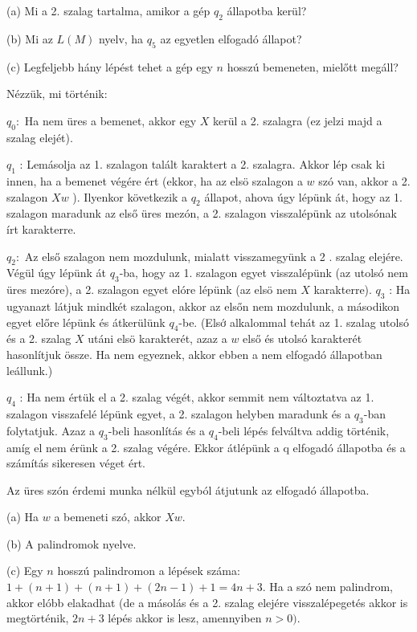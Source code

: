 (a) Mi a 2. szalag tartalma, amikor a gép $q_{2}$ állapotba kerül?

(b) Mi az $L(M)$ nyelv, ha $q_{5}$ az egyetlen elfogadó állapot?

(c) Legfeljebb hány lépést tehet a gép egy $n$ hosszú bemeneten, mielőtt megáll?


Nézzük, mi történik:

$q_{0}:$ Ha nem üres a bemenet, akkor egy $X$ kerül a 2. szalagra (ez jelzi majd a szalag elejét).

$q_{1}$ : Lemásolja az 1. szalagon talált karaktert a 2. szalagra. Akkor lép csak ki innen, ha a bemenet végére ért (ekkor, ha az elsö szalagon a $w$ szó van, akkor a 2. szalagon $X w$ ). Ilyenkor következik a $q_{2}$ állapot, ahova úgy lépünk át, hogy az 1. szalagon maradunk az első üres mezón, a 2. szalagon visszalépünk az utolsónak írt karakterre.

$q_{2}:$ Az első szalagon nem mozdulunk, mialatt visszamegyünk a 2 . szalag elejére. Végül úgy lépünk át $q_{3}$-ba, hogy az 1. szalagon egyet visszalépünk (az utolsó nem üres mezóre), a 2. szalagon egyet elóre lépünk (az elsö nem $X$ karakterre). $q_{3}$ : Ha ugyanazt látjuk mindkét szalagon, akkor az elsőn nem mozdulunk, a másodikon egyet előre lépünk és átkerülünk $q_{4}$-be. (Elsớ alkalommal tehát az 1. szalag utolsó és a 2. szalag $X$ utáni elsö karakterét, azaz a $w$ első és utolsó karakterét hasonlítjuk össze. Ha nem egyeznek, akkor ebben a nem elfogadó állapotban leállunk.)

$q_{4}$ : Ha nem értük el a 2. szalag végét, akkor semmit nem változtatva az 1. szalagon visszafelé lépünk egyet, a 2. szalagon helyben maradunk és a $q_{3}$-ban folytatjuk. Azaz a $q_{3}$-beli hasonlítás és a $q_{4}$-beli lépés felváltva addig történik, amíg el nem érünk a 2. szalag végére. Ekkor átlépünk a q elfogadó állapotba és a számítás sikeresen véget ért.

Az üres szón érdemi munka nélkül egyból átjutunk az elfogadó állapotba.

(a) Ha $w$ a bemeneti szó, akkor $X w$.

(b) A palindromok nyelve.

(c) Egy $n$ hosszú palindromon a lépések száma: $1+(n+1)+(n+1)+(2 n-1)+1=4 n+3$. Ha a szó nem palindrom, akkor elóbb elakadhat (de a másolás és a 2. szalag elejére visszalépegetés akkor is megtörténik, $2 n+3$ lépés akkor is lesz, amennyiben $n>0)$.